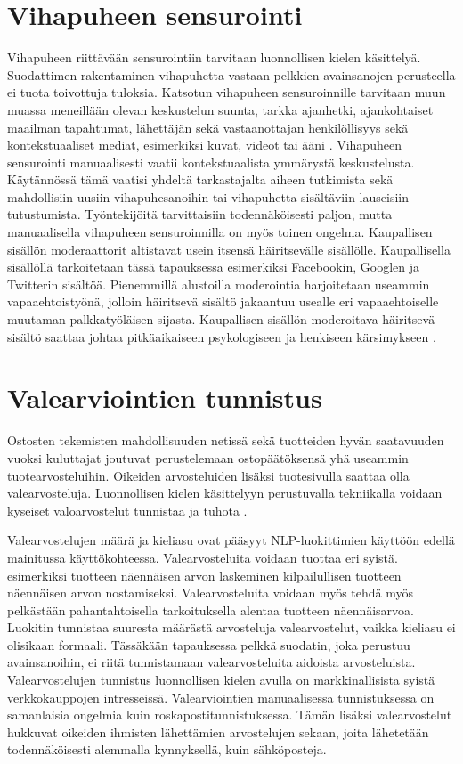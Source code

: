 \section{Vihapuheen sensurointi}

Vihapuheen riittävään sensurointiin tarvitaan luonnollisen kielen käsittelyä. Suodattimen rakentaminen vihapuhetta vastaan pelkkien avainsanojen perusteella ei tuota toivottuja tuloksia. Katsotun vihapuheen sensuroinnille tarvitaan muun muassa meneillään olevan keskustelun suunta, tarkka ajanhetki, ajankohtaiset maailman tapahtumat, lähettäjän sekä vastaanottajan henkilöllisyys sekä kontekstuaaliset mediat, esimerkiksi kuvat, videot tai ääni \citep{hate}. Vihapuheen sensurointi manuaalisesti vaatii kontekstuaalista ymmärystä keskustelusta. Käytännössä tämä vaatisi yhdeltä tarkastajalta aiheen tutkimista sekä mahdollisiin uusiin vihapuhesanoihin tai vihapuhetta sisältäviin lauseisiin tutustumista. Työntekijöitä tarvittaisiin todennäköisesti paljon, mutta manuaalisella vihapuheen sensuroinnilla on myös toinen ongelma. Kaupallisen sisällön moderaattorit altistavat usein itsensä häiritsevälle sisällölle. Kaupallisella sisällöllä tarkoitetaan tässä tapauksessa esimerkiksi Facebookin, Googlen ja Twitterin sisältöä. Pienemmillä alustoilla moderointia harjoitetaan useammin vapaaehtoistyönä, jolloin häiritsevä sisältö jakaantuu usealle eri vapaaehtoiselle muutaman palkkatyöläisen sijasta. Kaupallisen sisällön moderoitava häiritsevä sisältö saattaa johtaa pitkäaikaiseen psykologiseen ja henkiseen kärsimykseen \citep{moderation}.

\section{Valearviointien tunnistus}
Ostosten tekemisten mahdollisuuden netissä sekä tuotteiden hyvän saatavuuden vuoksi kuluttajat joutuvat perustelemaan ostopäätöksensä yhä useammin tuotearvosteluihin. Oikeiden arvosteluiden lisäksi tuotesivulla saattaa olla valearvosteluja. Luonnollisen kielen käsittelyyn perustuvalla tekniikalla voidaan kyseiset valoarvostelut tunnistaa ja tuhota \citep{falsereview}.

Valearvostelujen määrä ja kieliasu ovat pääsyyt NLP-luokittimien käyttöön edellä mainitussa käyttökohteessa. Valearvosteluita voidaan tuottaa eri syistä. esimerkiksi tuotteen näennäisen arvon laskeminen kilpailullisen tuotteen näennäisen arvon nostamiseksi.  Valearvosteluita voidaan myös tehdä myös pelkästään pahantahtoisella tarkoituksella alentaa tuotteen näennäisarvoa. Luokitin tunnistaa suuresta määrästä arvosteluja valearvostelut, vaikka kieliasu ei olisikaan formaali. Tässäkään tapauksessa pelkkä suodatin, joka perustuu avainsanoihin, ei riitä tunnistamaan valearvosteluita aidoista arvosteluista. Valearvostelujen tunnistus luonnollisen kielen avulla on markkinallisista syistä verkkokauppojen intresseissä. Valearviointien manuaalisessa tunnistuksessa on samanlaisia ongelmia kuin roskapostitunnistuksessa. Tämän lisäksi valearvostelut hukkuvat oikeiden ihmisten lähettämien arvostelujen sekaan, joita lähetetään todennäköisesti alemmalla kynnyksellä, kuin sähköposteja.

